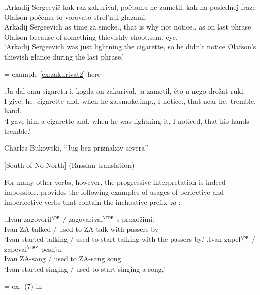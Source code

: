 \exg.\label{ex:zakurival:prog:rep}Arkadij Sergeevi\v{c} kak raz zakurival, po\`{e}tomu ne zametil, kak na poslednej fraze Olafson po\v{c}emu-to vorovato strel'nul glazami.\\
Arkadij Sergeevich as time za.smoke., {that is why} not notice., as on last phrase Olafson {because of something} thievishly shoot.sem. eye.\\
\vspace{0.5em}
`Arkadij Sergeevich was just lightning the cigarette, so he didn't notice Olafson's thievish glance during the last phrase.'
\begin{flushright}
\vspace{-1em}
= example \ref{ex:zakurivat2} here
\end{flushright}

\exg.\label{ex:zakurival:prog:new}Ja dal emu sigaretu i, kogda on zakurival, ja zametil, \v{c}to u nego dro\v{z}at ruki.\\
I give. he. cigarette and, when he za.smoke.imp., I notice., that near he. tremble. hand.\\
\vspace{0.5em}
`I gave him a cigarette and, when he was lightning it, I noticed, that his hands tremble.'
\begin{flushright}
\vspace{-1em}
Charles Bukowski, ``Jug bez priznakov severa''
\end{flushright}
\begin{flushright}
\vspace{-1em}
[South of No North] (Russian translation)
\end{flushright}

For many other verbs, however, the progressive interpretation is indeed impossible. \citet{Braginsky:08} provides the following examples of usages of perfective and imperfective verbs that contain the inchoative prefix \textit{za-}:

\ex.\label{ex:za:imp:Brag}\ag.\label{ex:za:imp:Brag1}Ivan zagovoril$^{\PF}$ / zagovarival$^{\IPF}$ s proxo\v{z}imi.\\
Ivan ZA-talked / {used to ZA-talk} with passers-by\\
\vspace{0.5em}
`Ivan started talking / used to start talking with the passers-by.'
\bg.\label{ex:za:imp:Brag2}Ivan zapel$^{\PF}$ / zapeval$^{\IPF}$ pesnju.\\
Ivan ZA-sang / {used to ZA-sang} song\\
\vspace{0.5em}
`Ivan started singing / used to start singing a song.'
\begin{flushright}
\vspace{-0.5em}
= ex.~(7) in \citealt[221]{Braginsky:08}
\end{flushright}

